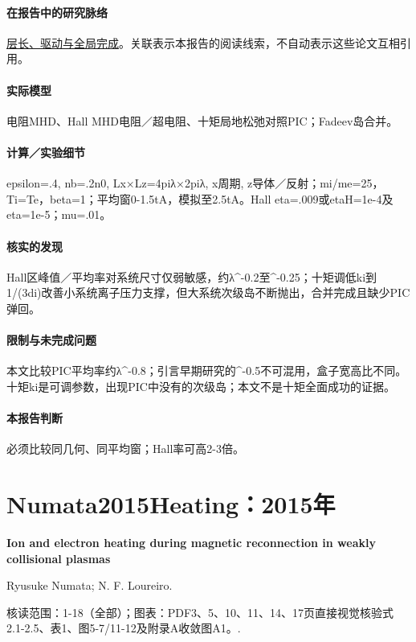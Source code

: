 \documentclass[UTF8,a4paper,11pt,openany,fontset=fandol]{ctexbook}
\begin{document}
\paragraph{在报告中的研究脉络}\hyperref[story:global]{层长、驱动与全局完成}。关联表示本报告的阅读线索，不自动表示这些论文互相引用。

\paragraph{实际模型}电阻MHD、Hall MHD电阻／超电阻、十矩局地松弛对照PIC；Fadeev岛合并。

\paragraph{计算／实验细节}epsilon=.4, nb=.2n0, Lx×Lz=4piλ×2piλ, x周期, z导体／反射；mi/me=25，Ti=Te，beta=1；平均窗0-1.5tA，模拟至2.5tA。Hall eta=.009或etaH=1e-4及eta=1e-5；mu=.01。

\paragraph{核实的发现}Hall区峰值／平均率对系统尺寸仅弱敏感，约λ\textasciicircum{}-0.2至\textasciicircum{}-0.25；十矩调低ki到1/(3di)改善小系统离子压力支撑，但大系统次级岛不断抛出，合并完成且缺少PIC弹回。

\paragraph{限制与未完成问题}本文比较PIC平均率约λ\textasciicircum{}-0.8；引言早期研究的\textasciicircum{}-0.5不可混用，盒子宽高比不同。十矩ki是可调参数，出现PIC中没有的次级岛；本文不是十矩全面成功的证据。

\paragraph{本报告判断}必须比较同几何、同平均窗；Hall率可高2-3倍。

\section{Numata2015Heating：2015年}\label{paper:Numata2015Heating}

\textbf{Ion and electron heating during magnetic reconnection in weakly collisional plasmas}\citep{Numata2015Heating}\

Ryusuke Numata;  N. F. Loureiro.

\textsf{核读范围：}1-18（全部）；\textsf{图表：}PDF3、5、10、11、14、17页直接视觉核验式2.1-2.5、表1、图5-7/11-12及附录A收敛图A1。.
\end{document}
